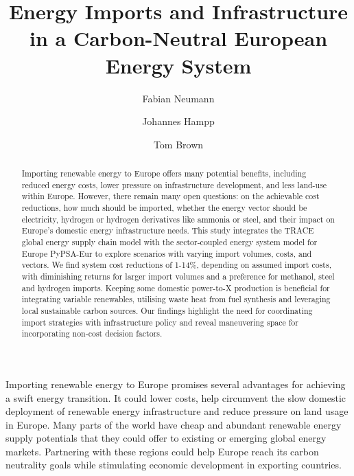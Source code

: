 \documentclass[5p,10pt]{elsarticle}
\begin{document}
\begin{frontmatter}

	\title{Energy Imports and Infrastructure in a Carbon-Neutral European Energy System}

	\author[tub]{Fabian Neumann}
	\author[pik]{Johannes Hampp}
	\author[tub]{Tom Brown}

	\address[tub]{Department of Digital Transformation in Energy Systems, Institute of Energy Technology,\\Technische Universität Berlin, Fakultät III, Einsteinufer 25 (TA 8), 10587 Berlin, Germany}
	\address[pik]{Potsdam Institute for Climate Impact Research (PIK), Member of the Leibniz Association, P.O.~Box 60 12 03, 14412 Potsdam, Germany}

	\begin{abstract}
		Importing renewable energy to Europe offers many potential benefits, including reduced energy costs, lower pressure on infrastructure development, and less land-use within Europe. However, there remain many open questions: on the achievable cost reductions, how much should be imported, whether the energy vector should be electricity, hydrogen or hydrogen derivatives like ammonia or steel, and their impact on Europe's domestic energy infrastructure needs. This study integrates the TRACE global energy supply chain model with the sector-coupled energy system model for Europe PyPSA-Eur to explore scenarios with varying import volumes, costs, and vectors. We find system cost reductions of 1-14\%, depending on assumed import costs, with diminishing returns for larger import volumes and a preference for methanol, steel and hydrogen imports. Keeping some domestic power-to-X production is beneficial for integrating variable renewables, utilising waste heat from fuel synthesis and leveraging local sustainable carbon sources. Our findings highlight the need for coordinating import strategies with infrastructure policy and reveal maneuvering space for incorporating non-cost decision factors.

	\end{abstract}

\end{frontmatter}



Importing renewable energy to Europe promises several advantages for achieving a
swift energy transition. It could lower costs, help circumvent the slow domestic
deployment of renewable energy infrastructure and reduce pressure on land usage
in Europe. Many parts of the world have cheap and abundant renewable energy
supply potentials that they could offer to existing or emerging global energy
markets.\cite{irenaGlobalHydrogen2022,luxSupplyCurves2021,vanderzwaanTimmermansDream2021,fasihiLongTermHydrocarbon2017,reichenbergDeepDecarbonization2022,galvanExportingSunshine2022,armijoFlexibleProduction2020,pfennigGlobalGISbasedPotential2023}
Partnering with these regions could help Europe reach its carbon neutrality
goals while stimulating economic development in exporting countries.
\end{document}
